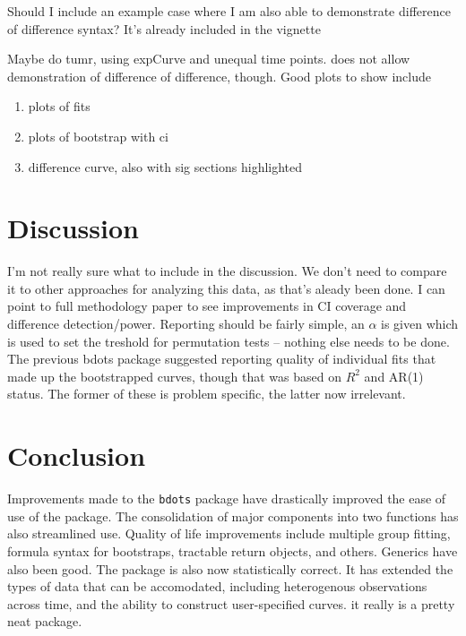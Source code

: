 \documentclass{article}
\begin{document}
Should I include an example case where I am also able to demonstrate difference of difference syntax? It's already included in the vignette

Maybe do tumr, using expCurve and unequal time points. does not allow demonstration of difference of difference, though. Good plots to show include

\begin{enumerate}
\item plots of fits
\item plots of bootstrap with ci
\item difference curve, also with sig sections highlighted
\end{enumerate}

\section{Discussion}
I'm not really sure what to include in the discussion. We don't need to compare it to other approaches for analyzing this data, as that's aleady been done. I can point to full methodology paper to see improvements in CI coverage and difference detection/power. Reporting should be fairly simple, an $\alpha$ is given which is used to set the treshold for permutation tests -- nothing else needs to be done. The previous bdots package suggested reporting quality of individual fits that made up the bootstrapped curves, though that was based on $R^2$ and AR(1) status. The former of these is problem specific, the latter now irrelevant.


\section{Conclusion}

Improvements made to the \texttt{bdots} package have drastically improved the ease of use of the package. The consolidation of major components into two functions has also streamlined use. Quality of life improvements include multiple group fitting, formula syntax for bootstraps, tractable return objects, and others. Generics have also been good. The package is also now statistically correct. It has extended the types of data that can be accomodated, including heterogenous observations across time, and the ability to construct user-specified curves. it really is a pretty neat package.
\end{document}
